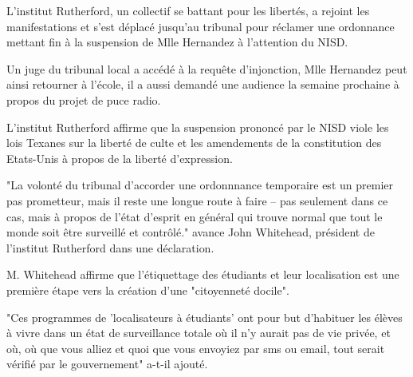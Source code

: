 \documentclass[a4paper,11pt]{article}
\begin{document}
L'institut Rutherford, un collectif se battant pour les libertés, a rejoint les manifestations et s'est déplacé jusqu'au
tribunal pour réclamer une ordonnance mettant fin à la suspension de Mlle Hernandez à l'attention du NISD.

Un juge du tribunal local a accédé à la requête d'injonction, Mlle Hernandez peut ainsi retourner à l'école, il a aussi
demandé une audience la semaine prochaine à propos du projet de puce radio.

L'institut Rutherford affirme que la suspension prononcé par le NISD viole les lois Texanes sur la liberté de culte et
les amendements de la constitution des Etats-Unis à propos de la liberté d'expression.

"La volonté du tribunal d'accorder une ordonnnance temporaire est un premier pas prometteur, mais il reste une longue
route à faire -- pas seulement dans ce cas, mais à propos de l'état d'esprit en général qui trouve normal que tout le
monde soit être surveillé et contrôlé." avance John Whitehead, président de l'institut Rutherford dans une déclaration.

M. Whitehead affirme que l'étiquettage des étudiants et leur localisation est une première étape vers la création d'une
"citoyenneté docile".

"Ces programmes de 'localisateurs à étudiants' ont pour but d'habituer les élèves à vivre dans un état de surveillance
totale où il n'y aurait pas de vie privée, et où, où que vous alliez et quoi que vous envoyiez par sms ou email, tout
serait vérifié par le gouvernement" a-t-il ajouté.
\end{document}
